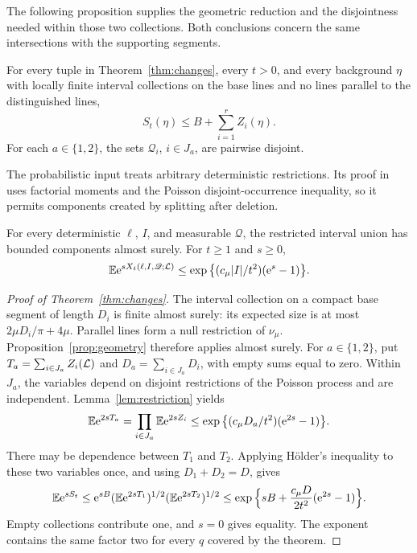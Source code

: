 \documentclass[11pt,letterpaper]{article}
\begin{document}
The following proposition supplies the geometric reduction and the disjointness needed within those two collections. Both conclusions concern the same intersections with the supporting segments.

\begin{proposition}\label{prop:geometry}
For every tuple in Theorem~\ref{thm:changes}, every $t>0$, and every background $\eta$ with locally finite interval collections on the base lines and no lines parallel to the distinguished lines,
\begin{equation}\label{eq:transfer}
 S_t(\eta)\le B+\sum_{i=1}^rZ_i(\eta).
\end{equation}
For each $a\in\{1,2\}$, the sets $\mathscr Q_i$, $i\in J_a$, are pairwise disjoint.
\end{proposition}

The probabilistic input treats arbitrary deterministic restrictions. Its proof in~\cite{ORC26} uses factorial moments and the Poisson disjoint-occurrence inequality, so it permits components created by splitting after deletion.

\begin{lemma}\label{lem:restriction}
For every deterministic $\ell$, $I$, and measurable $\mathscr Q$, the restricted interval union has bounded components almost surely. For $t\ge1$ and $s\ge0$,
\begin{equation}\label{eq:restricted}
 \mathbb E\mathrm{e}^{sX_t(\ell,I,\mathscr Q;\mathcal L)}
 \le\exp\big\{(c_\mu|I|/t^2)(\mathrm{e}^s-1)\big\}.
\end{equation}
\end{lemma}

\begin{proof}[Proof of Theorem~\ref{thm:changes}]
The interval collection on a compact base segment of length $D_i$ is finite almost surely: its expected size is at most $2\mu D_i/\pi+4\mu$. Parallel lines form a null restriction of $\nu_\mu$. Proposition~\ref{prop:geometry} therefore applies almost surely. For $a\in\{1,2\}$, put $T_a=\sum_{i\in J_a}Z_i(\mathcal L)$ and $D_a=\sum_{i\in J_a}D_i$, with empty sums equal to zero. Within $J_a$, the variables depend on disjoint restrictions of the Poisson process and are independent. Lemma~\ref{lem:restriction} yields
\begin{equation}\label{eq:group}
 \mathbb E\mathrm{e}^{2sT_a}
 =\prod_{i\in J_a}\mathbb E\mathrm{e}^{2sZ_i}
 \le\exp\big\{(c_\mu D_a/t^2)(\mathrm{e}^{2s}-1)\big\}.
\end{equation}
There may be dependence between $T_1$ and $T_2$. Applying H\"older's inequality to these two variables once, and using $D_1+D_2=D$, gives
\begin{equation}\label{eq:holder}
 \mathbb E\mathrm{e}^{sS_t}
 \le\mathrm{e}^{sB}(\mathbb E\mathrm{e}^{2sT_1})^{1/2}(\mathbb E\mathrm{e}^{2sT_2})^{1/2}
 \le\exp\Big\{sB+\frac{c_\mu D}{2t^2}(\mathrm{e}^{2s}-1)\Big\}.
\end{equation}
Empty collections contribute one, and $s=0$ gives equality. The exponent contains the same factor two for every $q$ covered by the theorem.
\end{proof}
\end{document}
